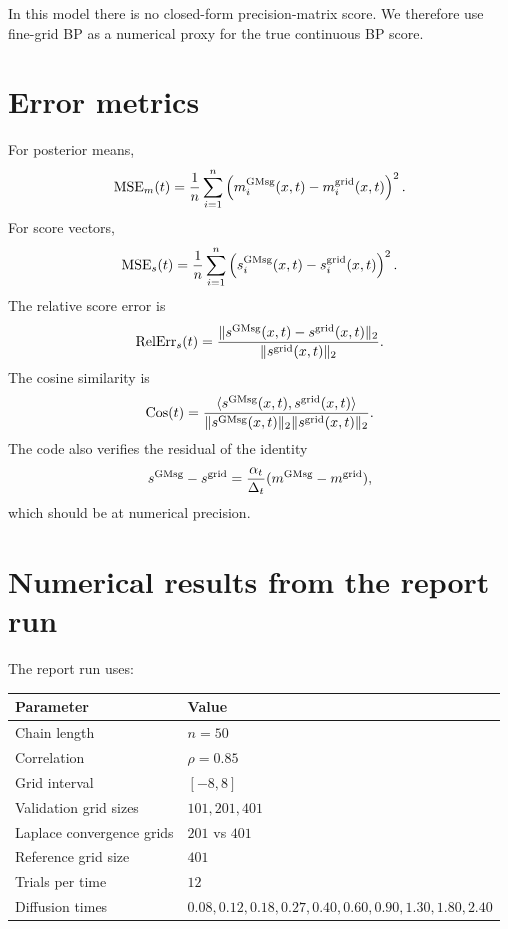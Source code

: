 \documentclass[11pt]{article}
\begin{document}
In this model there is no closed-form precision-matrix score. We therefore use fine-grid BP as a numerical proxy for the true continuous BP score.

\section{Error metrics}

For posterior means,
\begin{equation}
  \operatorname{MSE}_m(t)
  = \frac1n\sum_{i=1}^n
  \left(m_i^{\rm GMsg}(x,t)-m_i^{\rm grid}(x,t)\right)^2.
\end{equation}
For score vectors,
\begin{equation}
  \operatorname{MSE}_s(t)
  = \frac1n\sum_{i=1}^n
  \left(s_i^{\rm GMsg}(x,t)-s_i^{\rm grid}(x,t)\right)^2.
\end{equation}
The relative score error is
\begin{equation}
  \operatorname{RelErr}_s(t)
  = \frac{\|s^{\rm GMsg}(x,t)-s^{\rm grid}(x,t)\|_2}
  {\|s^{\rm grid}(x,t)\|_2}.
\end{equation}
The cosine similarity is
\begin{equation}
  \operatorname{Cos}(t)
  = \frac{\langle s^{\rm GMsg}(x,t),s^{\rm grid}(x,t)\rangle}
  {\|s^{\rm GMsg}(x,t)\|_2\|s^{\rm grid}(x,t)\|_2}.
\end{equation}
The code also verifies the residual of the identity
\begin{equation}
  s^{\rm GMsg}-s^{\rm grid}
  =\frac{\alpha_t}{\Delta_t}(m^{\rm GMsg}-m^{\rm grid}),
\end{equation}
which should be at numerical precision.

\section{Numerical results from the report run}

The report run uses:
\begin{center}
\begin{tabular}{ll}
\toprule
Parameter & Value \\
\midrule
Chain length & \(n=50\) \\
Correlation & \(\rho=0.85\) \\
Grid interval & \([-8,8]\) \\
Validation grid sizes & \(101,201,401\) \\
Laplace convergence grids & \(201\) vs \(401\) \\
Reference grid size & \(401\) \\
Trials per time & \(12\) \\
Diffusion times & \(0.08,0.12,0.18,0.27,0.40,0.60,0.90,1.30,1.80,2.40\) \\
\bottomrule
\end{tabular}
\end{center}
\end{document}
